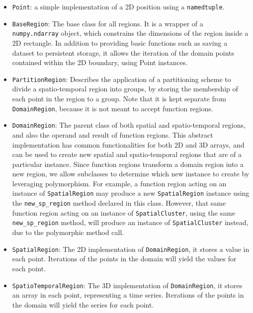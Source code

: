 \begin{itemize}
	\item \texttt{Point}: a simple implementation of a 2D position using a \texttt{namedtuple}.
	
	\item \texttt{BaseRegion}: The base class for all regions. It is a wrapper of a \texttt{numpy.ndarray} object, which constrains the dimensions of the region inside a 2D rectangle. In addition to providing basic functions such as saving a dataset to persistent storage, it allows the iteration of the domain points contained within the 2D boundary, using Point instances.
	
	\item \texttt{PartitionRegion}: Describes the application of a partitioning scheme to divide a spatio-temporal region into groups, by storing the membership of each point in the region to a group. Note that it is kept separate from \texttt{DomainRegion}, because it is not meant to accept function regions.
	
	\item \texttt{DomainRegion}: The parent class of both spatial and spatio-temporal regions, and also the operand and result of function regions. This abstract implementation has common functionalities for both 2D and 3D arrays, and can be used to create new spatial and spatio-temporal regions that are of a particular instance. Since function regions transform a domain region into a new region, we allow subclasses to determine which new instance to create by leveraging polymorphism. For example, a function region acting on an instance of \texttt{SpatialRegion} may produce a new \texttt{SpatialRegion} instance using the \texttt{new\_sp\_region} method declared in this class. However, that same function region acting on an instance of \texttt{SpatialCluster}, using the same \texttt{new\_sp\_region} method, will produce an instance of \texttt{SpatialCluster} instead, due to the polymorphic method call. 
	
	\item \texttt{SpatialRegion}: The 2D implementation of \texttt{DomainRegion}, it stores a value in each point. Iterations of the points in the domain will yield the values for each point.
	
	\item \texttt{SpatioTemporalRegion}: The 3D implementation of \texttt{DomainRegion}, it stores an array in each point, representing a time series. Iterations of the points in the domain will yield the series for each point.
	

\end{itemize}
